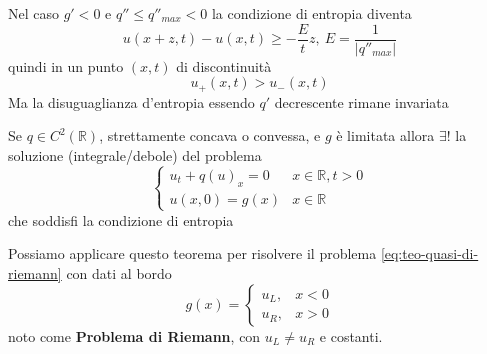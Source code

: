 \documentclass[10pt,a4paper,twoside,openright]{book}
\begin{document}
\begin{nb}
	Nel caso $\displaystyle g'< 0$ e $\displaystyle q''\leqslant q''_{max} < 0$ la condizione di entropia diventa 
	\begin{equation*}
		u( x+z,t) -u( x,t) \geqslant -\frac{E}{t} z,\ E=\frac{1}{| q''_{max}| }
	\end{equation*}
	quindi in un punto $\displaystyle ( x,t)$ di discontinuità
	\begin{equation*}
		u_{+}( x,t)  >u_{-}( x,t)
	\end{equation*}
	Ma la disuguaglianza d'entropia essendo $\displaystyle q'$ decrescente rimane invariata
\end{nb}
\begin{theorem}
	Se $\displaystyle q\in C^{2}(\mathbb{R})$, strettamente concava o convessa, e $\displaystyle g$ è limitata allora $\displaystyle \exists !$ la soluzione (integrale/debole) del problema
	\begin{equation}
		\begin{cases}
			u_{t} +q( u)_{x} =0 & x\in \mathbb{R} ,t >0 \\
			u( x,0) =g( x)      & x\in \mathbb{R}       
		\end{cases}
		\label{eq:teo-quasi-di-riemann}
	\end{equation}
	che soddisfi la condizione di entropia
\end{theorem}
Possiamo applicare questo teorema per risolvere il problema \eqref{eq:teo-quasi-di-riemann} con dati al bordo 
\begin{equation*}
	g( x) =
	\begin{cases}
		u_{L} , & x< 0 \\
		u_{R} , & x >0 
	\end{cases}
\end{equation*}
noto come \textbf{Problema di Riemann}, con $\displaystyle u_{L} \neq u_{R}$ e costanti.
\end{document}
